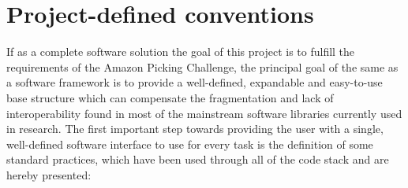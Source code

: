 \section{Project-defined conventions}
If as a complete software solution the goal of this project is to
fulfill the requirements of the Amazon Picking Challenge, the
principal goal of the same as a software framework is to provide a
well-defined, expandable and easy-to-use base structure which can
compensate the fragmentation and lack of interoperability found in
most of the mainstream software libraries currently used in
research. The first important step towards providing the user with a
single, well-defined software interface to use for every task is the
definition of some standard practices, which have been used through
all of the code stack and are hereby presented:

